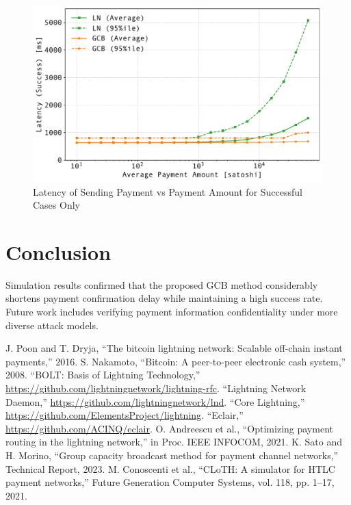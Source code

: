 \documentclass[conference]{IEEEtran}
\begin{document}
\begin{figure}[htbp]
	\centerline{\includegraphics[width=\linewidth]{fig/pmt_amt_vs_time}}
	\caption{Latency of Sending Payment vs Payment Amount for Successful Cases Only}
	\label{fig:pmt_amt_vs_time}
\end{figure}

\section{Conclusion}

Simulation results confirmed that the proposed GCB method considerably shortens payment confirmation delay while maintaining a high success rate.
Future work includes verifying payment information confidentiality under more diverse attack models.

\begin{thebibliography}{00}
	 J. Poon and T. Dryja, ``The bitcoin lightning network: Scalable off-chain instant payments,'' 2016.
	 S. Nakamoto, ``Bitcoin: A peer-to-peer electronic cash system,'' 2008.
	 ``BOLT: Basis of Lightning Technology,'' \url{https://github.com/lightningnetwork/lightning-rfc}.
	 ``Lightning Network Daemon,'' \url{https://github.com/lightningnetwork/lnd}.
	 ``Core Lightning,'' \url{https://github.com/ElementsProject/lightning}.
	 ``Eclair,'' \url{https://github.com/ACINQ/eclair}.
	 O. Andreescu et al., ``Optimizing payment routing in the lightning network,'' in Proc. IEEE INFOCOM, 2021.
	 K. Sato and H. Morino, ``Group capacity broadcast method for payment channel networks,'' Technical Report, 2023.
	 M. Conoscenti et al., ``CLoTH: A simulator for HTLC payment networks,'' Future Generation Computer Systems, vol. 118, pp. 1--17, 2021.
\end{thebibliography}
\end{document}

